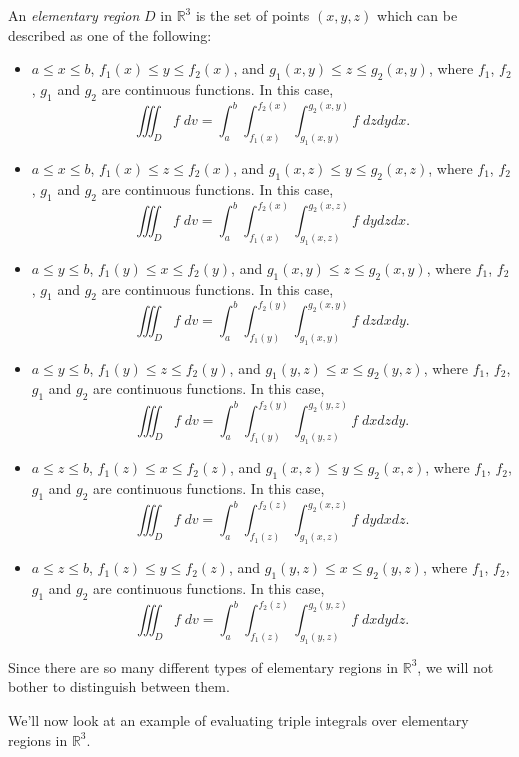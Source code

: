 \documentclass{ximera}
\begin{document}
\begin{definition}
An \emph{elementary region} $D$ in $\mathbb{R}^3$ is the set of points $(x,y,z)$ which can be described as one of the following:
\begin{itemize}
\item $a\leq x\leq b$, $f_1(x)\leq y \leq f_2(x)$, and $g_1(x,y)\leq z\leq g_2(x,y)$, where $f_1$, $f_2$, $g_1$ and $g_2$ are continuous functions. In this case,
\[
\iiint_D f\;dv = \int_a^b\int_{f_1(x)}^{f_2(x)}\int_{g_1(x,y)}^{g_2(x,y)}f\;dzdydx.
\]
\item $a\leq x\leq b$, $f_1(x)\leq z \leq f_2(x)$, and $g_1(x,z)\leq y\leq g_2(x,z)$, where $f_1$, $f_2$, $g_1$ and $g_2$ are continuous functions. In this case,
\[
\iiint_D f\;dv = \int_a^b\int_{f_1(x)}^{f_2(x)}\int_{g_1(x,z)}^{g_2(x,z)}f\;dydzdx.
\]
\item $a\leq y\leq b$, $f_1(y)\leq x \leq f_2(y)$, and $g_1(x,y)\leq z\leq g_2(x,y)$, where $f_1$, $f_2$, $g_1$ and $g_2$ are continuous functions. In this case,
\[
\iiint_D f\;dv = \int_a^b\int_{f_1(y)}^{f_2(y)}\int_{g_1(x,y)}^{g_2(x,y)}f\;dzdxdy.
\]
\item $a\leq y\leq b$, $f_1(y)\leq z \leq f_2(y)$, and $g_1(y,z)\leq x\leq g_2(y,z)$, where $f_1$, $f_2$, $g_1$ and $g_2$ are continuous functions. In this case,
\[
\iiint_D f\;dv = \int_a^b\int_{f_1(y)}^{f_2(y)}\int_{g_1(y,z)}^{g_2(y,z)}f\;dxdzdy.
\]
\item $a\leq z\leq b$, $f_1(z)\leq x \leq f_2(z)$, and $g_1(x,z)\leq y\leq g_2(x,z)$, where $f_1$, $f_2$, $g_1$ and $g_2$ are continuous functions. In this case,
\[
\iiint_D f\;dv = \int_a^b\int_{f_1(z)}^{f_2(z)}\int_{g_1(x,z)}^{g_2(x,z)}f\;dydxdz.
\]
\item $a\leq z\leq b$, $f_1(z)\leq y \leq f_2(z)$, and $g_1(y,z)\leq x\leq g_2(y,z)$, where $f_1$, $f_2$, $g_1$ and $g_2$ are continuous functions. In this case,
\[
\iiint_D f\;dv = \int_a^b\int_{f_1(z)}^{f_2(z)}\int_{g_1(y,z)}^{g_2(y,z)}f\;dxdydz.
\]
\end{itemize}
\end{definition}

Since there are so many different types of elementary regions in $\mathbb{R}^3$, we will not bother to distinguish between them. 

We'll now look at an example of evaluating triple integrals over elementary regions in $\mathbb{R}^3$.
\end{document}

